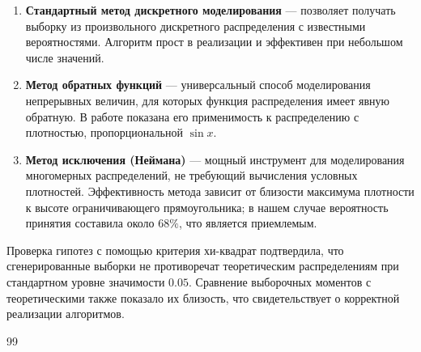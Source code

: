 \documentclass[bachelor, och, pract3]{SCWorks}
\begin{document}
\begin{enumerate}
    \item \textbf{Стандартный метод дискретного моделирования} — позволяет получать выборку из произвольного дискретного распределения с известными вероятностями. Алгоритм прост в реализации и эффективен при небольшом числе значений.
    \item \textbf{Метод обратных функций} — универсальный способ моделирования непрерывных величин, для которых функция распределения имеет явную обратную. В работе показана его применимость к распределению с плотностью, пропорциональной $\sin x$.
    \item \textbf{Метод исключения (Неймана)} — мощный инструмент для моделирования многомерных распределений, не требующий вычисления условных плотностей. Эффективность метода зависит от близости максимума плотности к высоте ограничивающего прямоугольника; в нашем случае вероятность принятия составила около $68\%$, что является приемлемым.
\end{enumerate}

Проверка гипотез с помощью критерия хи-квадрат подтвердила, что сгенерированные выборки не противоречат теоретическим распределениям при стандартном уровне значимости $0.05$. Сравнение выборочных моментов с теоретическими также показало их близость, что свидетельствует о корректной реализации алгоритмов.


\begin{thebibliography}{99}


\end{thebibliography}


\appendix
\end{document}
